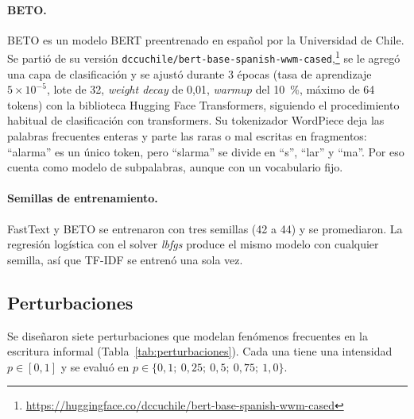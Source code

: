 \documentclass[11pt,a4paper]{article}
\newcommand{\cod}[1]{\texttt{#1}}
\begin{document}
\paragraph{BETO.} BETO es un modelo BERT preentrenado en español
por la Universidad de Chile. Se partió de su versión
\cod{dccuchile/bert-base-spanish-wwm-cased},\footnote{\url{https://huggingface.co/dccuchile/bert-base-spanish-wwm-cased}}
se le agregó una capa de clasificación y se ajustó durante 3 épocas (tasa de aprendizaje
$5\times10^{-5}$, lote de 32, \emph{weight decay} de 0,01, \emph{warmup} del 10~\%, máximo de
64 tokens) con la biblioteca Hugging Face Transformers, siguiendo el procedimiento habitual de
clasificación con transformers. Su tokenizador
WordPiece deja las palabras frecuentes enteras
y parte las raras o mal escritas en fragmentos: \enquote{alarma} es un único token, pero
\enquote{slarma} se divide en \enquote{s}, \enquote{lar} y \enquote{ma}. Por eso
cuenta como modelo de subpalabras, aunque con un vocabulario fijo.

\paragraph{Semillas de entrenamiento.} FastText y BETO se entrenaron con tres semillas (42 a
44) y se promediaron. La regresión logística con el solver \emph{lbfgs} produce el mismo modelo
con cualquier semilla, así que TF-IDF se entrenó una sola vez.

\subsection{Perturbaciones}
\label{sec:perturbaciones}

Se diseñaron siete perturbaciones que modelan fenómenos frecuentes en la escritura informal
(Tabla~\ref{tab:perturbaciones}). Cada una tiene una intensidad $p \in [0,1]$ y se evaluó en
$p \in \{0{,}1;\ 0{,}25;\ 0{,}5;\ 0{,}75;\ 1{,}0\}$.
\end{document}
